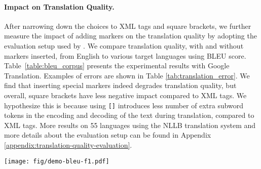 \documentclass[11pt,dvipsnames]{article}
\newcommand*{\img}[1]{\raisebox{-.19\baselineskip}{\texttt{[image: \#1]}}}
\begin{document}
\paragraph{Impact on Translation Quality.} After narrowing down the choices to XML tags and square brackets, we further measure the impact of adding markers on the translation quality by adopting the evaluation setup used by \citet{fan2021beyond}. We compare translation quality, with and without markers inserted, from English to various target languages using  BLEU score. Table~\ref{table:bleu_corpus} presents the experimental results with Google Translation. Examples of errors are shown in Table \ref{tab:translation_error}.  We find that inserting special  markers indeed  degrades translation quality, but overall,  square brackets have less negative impact compared to XML tags.    We hypothesize this is because using \texttt{[]} introduces less number of extra subword tokens  in the encoding and decoding of the text during translation, compared to XML tags. More results on 55 languages using the NLLB  translation system and more details about the evaluation setup can be found in Appendix \ref{appendix:translation-quality-evaluation}. 













\begin{figure*}[t!]
    \centering
    \vspace{-5pt}
    \texttt{[image: fig/demo-bleu-f1.pdf]}
    \vspace{-25pt}
    \caption{Comparison of translation quality (x-axis) and end-task performance (y-axis) for different label projection methods on the WikiANN dataset using NLLB translation system. EasyProject\img{fig/dot-easyproject.png}(\S\ref{sec:easyproject_intro}) outperforms alignment-based approach\img{fig/dot-awesomealign.png}on F scores for most languages, though inserting  markers degrades translation quality. The experimental setting is detailed in \S \ref{sec:comparsion_to_alignment}.}
    \label{fig:bleu_f1}
    \vspace{-15pt}
\end{figure*}
\end{document}
